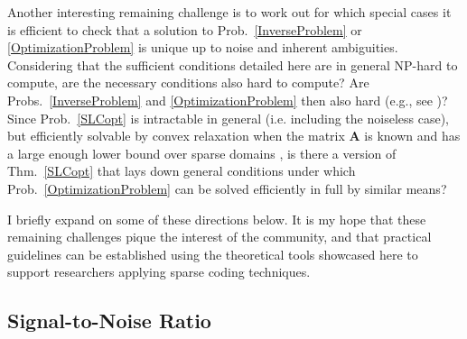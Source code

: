 Another interesting remaining challenge is to work out for which special cases it is efficient to check that a solution to Prob.~\ref{InverseProblem} or \ref{OptimizationProblem} is unique up to noise and inherent ambiguities. Considering that the sufficient conditions detailed here are in general NP-hard to compute, are the necessary conditions also hard to compute? Are Probs.~\ref{InverseProblem} and \ref{OptimizationProblem} then also hard (e.g., see \cite{tillmann2015computational})? Since Prob.~\ref{SLCopt} is intractable in general (i.e. including the noiseless case), but efficiently solvable by convex relaxation when the matrix $\mathbf{A}$ is known and has a large enough lower bound over sparse domains \cite{eldar2012compressed}, is there a version of Thm.~\ref{SLCopt} that lays down general conditions under which Prob.~\ref{OptimizationProblem} can be solved efficiently in full by similar means?  %



I briefly expand on some of these directions below. It is my hope that these remaining challenges pique the interest of the community, and that practical guidelines can be established using the theoretical tools showcased here to support researchers applying sparse coding techniques. 


\subsection{Signal-to-Noise Ratio}

